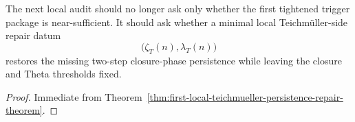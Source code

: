 \begin{corollary}\label{cor:current-post-r23-working-rule}
The next local audit should no longer ask only whether the first tightened trigger package is near-sufficient. It should ask whether a minimal local Teichm\"uller-side repair datum
\[
\bigl(\zeta_T(n),\lambda_T(n)\bigr)
\]
restores the missing two-step closure-phase persistence while leaving the closure and Theta thresholds fixed.
\end{corollary}

\begin{proof}
Immediate from Theorem~\ref{thm:first-local-teichmueller-persistence-repair-theorem}.
\end{proof}

